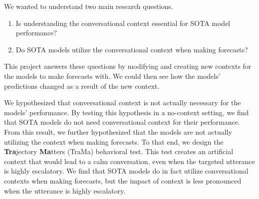 We wanted to understand two main research questions.
\begin{enumerate}
    \item Is understanding the conversational context essential for SOTA model performance?
    \item Do SOTA models utilize the conversational context when making forecasts?
\end{enumerate}
This project answers these questions by modifying and creating new contexts for the models to make forecasts with. 
We could then see how the models' predictions changed as a result of the new context. 

We hypothesized that conversational context is not actually necessary for the models' performance. 
By testing this hypothesis in a no-context setting, we find that SOTA models do not need conversational context for their performance.
From this result, we further hypothesized that the models are not actually utilizing the context when making forecasts. 
To that end, we design the \textbf{Tra}jectory \textbf{Ma}tters (TraMa) behavioral test.
This test creates an artificial context that would lead to a calm conversation, even when the targeted utterance is highly escalatory.
We find that SOTA models do in fact utilize conversational contexts when making forecasts, but the impact of context is less pronounced when the utterance is highly escalatory.
